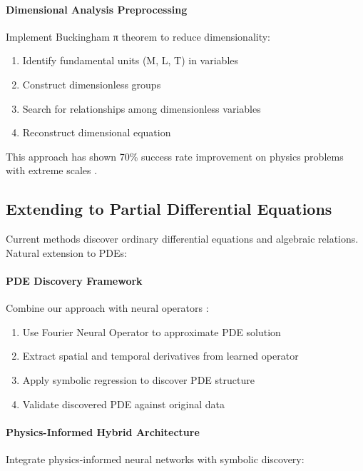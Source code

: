 \paragraph{Dimensional Analysis Preprocessing}
Implement Buckingham π theorem \citep{buckingham1914physically} to reduce dimensionality:

\begin{enumerate}
    \item Identify fundamental units (M, L, T) in variables
    \item Construct dimensionless groups
    \item Search for relationships among dimensionless variables
    \item Reconstruct dimensional equation
\end{enumerate}

This approach has shown 70\% success rate improvement on physics problems with extreme scales \citep{udrescu2020ai}.

\subsection{Extending to Partial Differential Equations}

Current methods discover ordinary differential equations and algebraic relations. Natural extension to PDEs:

\paragraph{PDE Discovery Framework}
Combine our approach with neural operators \citep{li2020fourier}:

\begin{enumerate}
    \item Use Fourier Neural Operator to approximate PDE solution
    \item Extract spatial and temporal derivatives from learned operator
    \item Apply symbolic regression to discover PDE structure
    \item Validate discovered PDE against original data
\end{enumerate}

\paragraph{Physics-Informed Hybrid Architecture}
Integrate physics-informed neural networks \citep{karniadakis2021physics} with symbolic discovery:


